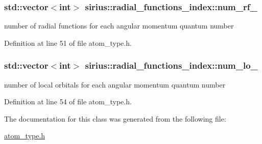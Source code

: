 \subsubsection[{num\+\_\+rf\+\_\+}]{\setlength{\rightskip}{0pt plus 5cm}std\+::vector$<$int$>$ sirius\+::radial\+\_\+functions\+\_\+index\+::num\+\_\+rf\+\_\+\hspace{0.3cm}{\ttfamily [private]}}\label{classsirius_1_1radial__functions__index_a0859adef221bb10651fe2140690cc979}


number of radial functions for each angular momentum quantum number 



Definition at line 51 of file atom\+\_\+type.\+h.

\hypertarget{classsirius_1_1radial__functions__index_a4e8aeb4eb19625b352bd6b05a0a5e93d}{}
\subsubsection[{num\+\_\+lo\+\_\+}]{\setlength{\rightskip}{0pt plus 5cm}std\+::vector$<$int$>$ sirius\+::radial\+\_\+functions\+\_\+index\+::num\+\_\+lo\+\_\+\hspace{0.3cm}{\ttfamily [private]}}\label{classsirius_1_1radial__functions__index_a4e8aeb4eb19625b352bd6b05a0a5e93d}


number of local orbitals for each angular momentum quantum number 



Definition at line 54 of file atom\+\_\+type.\+h.



The documentation for this class was generated from the following file\+:\begin{DoxyCompactItemize}
\item 
\hyperlink{atom__type_8h}{atom\+\_\+type.\+h}\end{DoxyCompactItemize}
